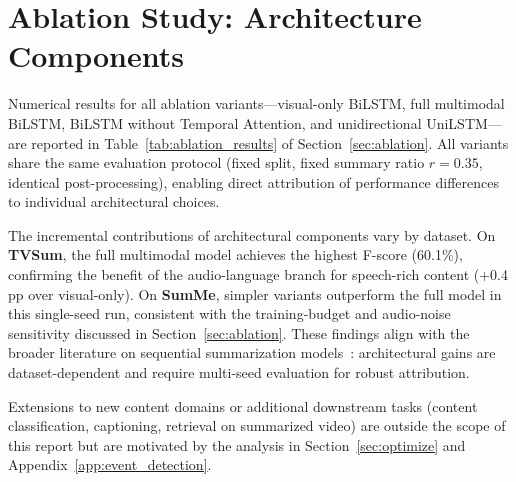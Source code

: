 \documentclass[10pt,conference]{IEEEtran}
\begin{document}
\section{Ablation Study: Architecture Components}
\label{app:ablation}

Numerical results for all ablation variants---visual-only BiLSTM, full
multimodal BiLSTM, BiLSTM without Temporal Attention, and unidirectional
UniLSTM---are reported in Table~\ref{tab:ablation_results} of
Section~\ref{sec:ablation}. All variants share the same evaluation protocol
(fixed split, fixed summary ratio $r{=}0.35$, identical post-processing),
enabling direct attribution of performance differences to individual
architectural choices.

The incremental contributions of architectural components vary by dataset.
On \textbf{TVSum}, the full multimodal model achieves the highest F-score
(60.1\%), confirming the benefit of the audio-language branch for
speech-rich content (+0.4\,pp over visual-only). On \textbf{SumMe}, simpler
variants outperform the full model in this single-seed run, consistent with
the training-budget and audio-noise sensitivity discussed in
Section~\ref{sec:ablation}. These findings align with the broader literature on
sequential summarization models~\cite{zhang2016lstm,fajtl2018}: architectural
gains are dataset-dependent and require multi-seed evaluation for robust
attribution.

Extensions to new content domains or additional downstream tasks
(content classification, captioning, retrieval on summarized video) are
outside the scope of this report but are motivated by the analysis in
Section~\ref{sec:optimize} and Appendix~\ref{app:event_detection}.


\end{document}
